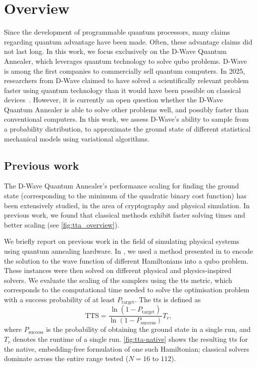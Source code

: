 \documentclass[10pt,a4paper]{article}
\numberwithin{equation}{section}
\begin{document}
\section{Overview}
Since the development of programmable quantum processors, many claims regarding quantum advantage have been made. Often, these advantage claims did not last long. In this work, we focus exclusively on the D-Wave Quantum Annealer, which leverages quantum technology to solve \gls{qubo} problems. D-Wave is among the first companies to commercially sell quantum computers. In 2025, researchers from D-Wave claimed to have solved a scientifically relevant problem faster using quantum technology than it would have been possible on classical devices~\cite{King_2025}. However, it is currently an open question whether the D-Wave Quantum Annealer is able to solve other problems well, and possibly faster than conventional computers. In this work, we assess D-Wave's ability to sample from a probability distribution, to approximate the ground state of different statistical mechanical models using variational algorithms.  
\subsection{Previous work}
The D-Wave Quantum Annealer's performance scaling for finding the ground state (corresponding to the minimum of the quadratic binary cost function) has been extensively studied, in the area of cryptography and physical simulation. In previous work, we found that classical methods exhibit faster solving times and better scaling (see \autoref{fig:tta_overview}).

We briefly report on previous work in the field of simulating physical systems using quantum annealing hardware. In \cite{rrf3-jm5m}, we used a method presented in \cite{jalowiecki2020parallel} to encode the solution to the wave function of different Hamiltonians into a \gls{qubo} problem. These instances were then solved on different physical and physics-inspired solvers. We evaluate the scaling of the samplers using the \gls{tts} metric, which corresponds to the computational time needed to solve the optimisation problem with a success probability of at least $P_\text{target}$. The \gls{tts} is defined as
\begin{equation}
\text{TTS} = \frac{\ln(1-P_\text{target})}{\ln(1-P_\text{success})} T_r,
\label{eq:tts}
\end{equation}
where $P_\text{success}$ is the probability of obtaining the ground state in a single run, and $T_r$ denotes the runtime of a single run. \autoref{fig:tta-native} shows the resulting \gls{tts} for the native, embedding-free formulation of one such Hamiltonian; classical solvers dominate across the entire range tested ($N=16$ to $112$).
\end{document}
